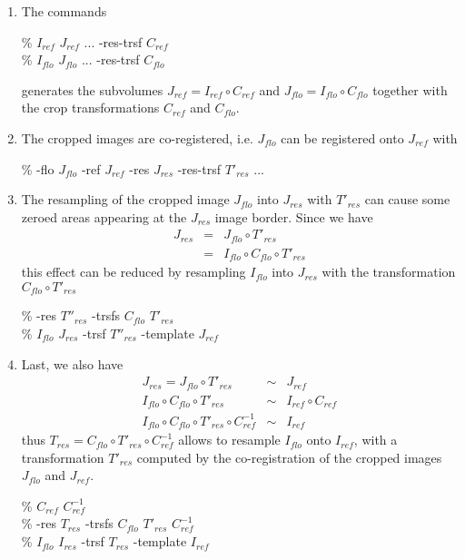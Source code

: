 \begin{enumerate}

\item The commands
\begin{code}{0.8}
\% \cropImage $I_{ref}$ $J_{ref}$ ... -res-trsf $C_{ref}$ \\
\% \cropImage $I_{flo}$ $J_{flo}$ ... -res-trsf $C_{flo}$
\end{code}
generates the subvolumes $J_{ref} = I_{ref} \circ C_{ref}$ and $J_{flo} = I_{flo} \circ C_{flo}$ together with the crop transformations $C_{ref}$ and $C_{flo}$.

\item The cropped images are co-registered, i.e. $J_{flo}$ can be registered onto $J_{ref}$ with 
\begin{code}{0.8}
\% \blockmatching -flo $J_{flo}$ -ref $J_{ref}$ -res $J_{res}$ -res-trsf ${T'}_{res}$ ...
\end{code}

\item The resampling of the cropped image $J_{flo}$ into $J_{res}$
  with ${T'}_{res}$ can cause some zeroed areas appearing at the
  $J_{res}$ image border. 
Since we have 
\begin{eqnarray*}
J_{res} & = & J_{flo} \circ {T'}_{res} \\
        & = & I_{flo} \circ C_{flo}  \circ {T'}_{res} 
\end{eqnarray*}
this effect can be reduced by resampling $I_{flo}$ into $J_{res}$ with
the transformation $C_{flo}  \circ {T'}_{res}$

\begin{code}{0.8}
\% \composeTrsf -res $T''_{res}$ -trsfs $C_{flo}$  ${T'}_{res}$ \\
\% \applyTrsf $I_{flo}$ $J_{res}$ -trsf $T''_{res}$ -template $J_{ref}$ 
\end{code}

\item Last, we also have
\begin{eqnarray*}
J_{res} = J_{flo} \circ {T'}_{res} & \sim & J_{ref} \\
I_{flo} \circ C_{flo} \circ {T'}_{res} & \sim &  I_{ref} \circ C_{ref} \\
I_{flo} \circ C_{flo} \circ {T'}_{res} \circ C^{-1}_{ref} & \sim & I_{ref}
\end{eqnarray*}
thus $T_{res} = C_{flo} \circ {T'}_{res} \circ C^{-1}_{ref}$ allows to
resample $I_{flo}$ onto $I_{ref}$, with a transformation ${T'}_{res}$
computed by the co-registration of the cropped images $J_{flo}$ and $J_{ref}$.

\begin{code}{0.8}
\% \invTrsf $C_{ref}$ $C^{-1}_{ref}$  \\
\% \composeTrsf -res $T_{res}$ -trsfs $C_{flo}$  ${T'}_{res}$ $C^{-1}_{ref}$ \\
\% \applyTrsf $I_{flo}$ $I_{res}$ -trsf $T_{res}$ -template $I_{ref}$ 
\end{code}

\end{enumerate}





